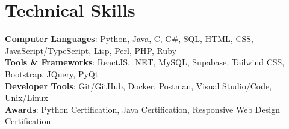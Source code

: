 \documentclass[letterpaper,11pt]{article}
\begin{document}
\section{Technical Skills}
 \begin{itemize}[leftmargin=0.0in, label={}]
    \small{\item{
     \textbf{Computer Languages}{: Python, Java, C, C\#, SQL, HTML, CSS, JavaScript/TypeScript, Lisp, Perl, PHP, Ruby} \\
     \textbf{Tools \& Frameworks}{: ReactJS, .NET, MySQL, Supabase, Tailwind CSS, Bootstrap, JQuery, PyQt} \\
     \textbf{Developer Tools}{: Git/GitHub, Docker, Postman, Visual Studio/Code, Unix/Linux} \\
     \textbf{Awards}{: Python Certification, Java Certification, Responsive Web Design Certification}
    }}
 \end{itemize}
\end{document}
